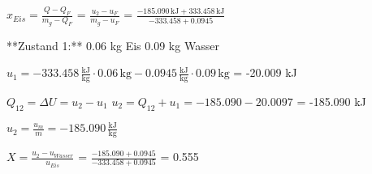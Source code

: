 \( x_{Eis} = \frac{Q - Q_F}{m_g - Q_F} \)  
= \( \frac{u_2 - u_F}{m_g - u_F} \)  
= \( \frac{-185.090 \, \text{kJ} + 333.458 \, \text{kJ}}{-333.458 + 0.0945} \)  

**Zustand 1:**  
0.06 kg Eis  
0.09 kg Wasser  

\( u_1 = -333.458 \, \frac{\text{kJ}}{\text{kg}} \cdot 0.06 \, \text{kg} - 0.0945 \, \frac{\text{kJ}}{\text{kg}} \cdot 0.09 \, \text{kg} \)  
= -20.009 kJ  

\( Q_{12} = \Delta U = u_2 - u_1 \)  
\( u_2 = Q_{12} + u_1 = -185.090 - 20.0097 \)  
= -185.090 kJ  

\( u_2 = \frac{u_m}{m} = -185.090 \, \frac{\text{kJ}}{\text{kg}} \)  

\( X = \frac{u_2 - u_{Wasser}}{u_{Eis}} \)  
= \( \frac{-185.090 + 0.0945}{-333.458 + 0.0945} \)  
= 0.555